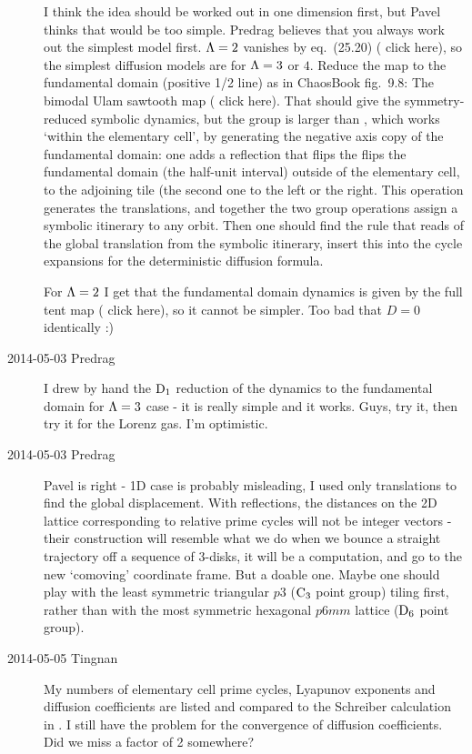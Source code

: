 \begin{description}
I think the idea should be worked out in one dimension first, but Pavel
thinks that would be too simple. Predrag believes that you always work
out the simplest model first. $\Lambda =2$ vanishes by eq.~(25.20)
( {click
here}), so the simplest diffusion models are for $\Lambda =3$ or $4$.
Reduce the map to the fundamental domain (positive 1/2 line) as in
ChaosBook fig.~9.8: The bimodal Ulam sawtooth map
( {click
here}). That should give the symmetry-reduced symbolic dynamics, but the
group is larger than , which works `within the elementary cell', by
generating the negative axis copy of the fundamental domain: one adds a
reflection that flips the flips the fundamental domain (the half-unit
interval) outside of the elementary cell, to the adjoining tile (the
second one to the left or the right. This operation generates the
translations, and together the two group operations assign a symbolic
itinerary to any orbit. Then one should find the rule that reads of the
global translation from the symbolic itinerary, insert this into the
cycle expansions for the deterministic diffusion formula.

For $\Lambda =2$ I get that the fundamental domain dynamics is given by
the full tent map
( {click
here}), so it cannot be simpler. Too bad that $D=0$ identically :)

\item[2014-05-03 Predrag] I drew by hand the $\textrm{D}_{1}$ reduction of the
dynamics to the fundamental domain for $\Lambda =3$ case - it is really
simple and it works. Guys, try it, then try it for the Lorenz gas. I'm
optimistic.

\item[2014-05-03 Predrag] Pavel is right - 1D case is probably
misleading, I used only translations to find the global displacement.
With reflections, the distances on the 2D lattice corresponding to
relative prime cycles will not be integer vectors - their construction
will resemble what we do when we bounce a straight trajectory off a
sequence of 3-disks, it will be a computation, and go to the new
`comoving' coordinate frame. But a doable one. Maybe one should play with
the least symmetric triangular $p3$ ($\textrm{C}_{3}$ point group) tiling first,
rather than with the most symmetric hexagonal $p6mm$ lattice ($\textrm{D}_{6}$
point group).

\item[2014-05-05 Tingnan] My numbers of elementary cell prime cycles,
Lyapunov exponents and diffusion coefficients are listed and compared
to the Schreiber calculation in . I still have the problem
for the convergence of diffusion coefficients. Did we miss a factor of 2
somewhere?


\end{description}
